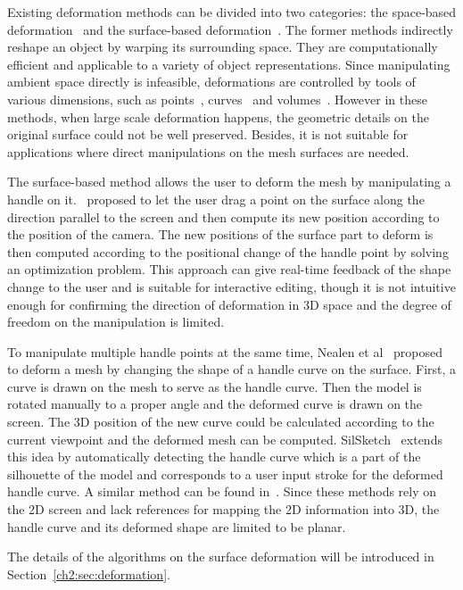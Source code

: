Existing deformation methods can be divided  into two categories:
the space-based deformation~\cite{GB08} and the surface-based
deformation~\cite{BS08,XZ09}. The former methods indirectly reshape
an object by warping its surrounding space. They are computationally
efficient and applicable to a variety of object representations.
Since manipulating ambient space directly is infeasible,
deformations are controlled by tools of various dimensions, such as
points~\cite{BK05}, curves~\cite{SF98,PJF97} and
volumes~\cite{SP86,JSW05,LLC08}. However in these methods, when
large scale deformation happens, the geometric details on the
original surface could not be well preserved. Besides, it is not
suitable for applications where direct manipulations on the mesh
surfaces are needed.

The surface-based method allows the user to deform the  mesh by
manipulating a handle on it.~\cite{NISA07,SCLARS04,SA07,SWS10}
proposed to let the user drag a point on the surface along the
direction parallel to the screen and then compute its new position
according to the position of the camera. The new positions of the
surface part to deform is then computed according to the positional
change of the handle point by solving an optimization problem. This
approach can give real-time feedback of the shape change to the user
and is suitable for interactive editing, though it is not intuitive
enough for confirming the direction of deformation in 3D space and
the degree of freedom on the manipulation is limited.

To manipulate multiple handle points at the same time,  Nealen et
al~\cite{NSAC05} proposed to deform a mesh by changing the shape of
a handle curve on the surface. First, a curve is drawn on the mesh
to serve as the handle curve. Then the model is rotated manually to
a proper angle and the deformed curve is drawn on the screen. The 3D
position of the new curve could be calculated according to the
current viewpoint and the deformed mesh can be computed.
SilSketch~\cite{ZNA07} extends this idea by automatically detecting
the handle curve which is a part of the silhouette of the model and
corresponds to a user input stroke for the deformed handle curve. A
similar method can be found in~\cite{KSV09}. Since these methods
rely on the 2D screen and lack references for mapping the 2D
information into 3D, the handle curve and its deformed shape are
limited to be planar.

The details of the algorithms on the surface deformation  will be
introduced in Section~\ref{ch2:sec:deformation}.

